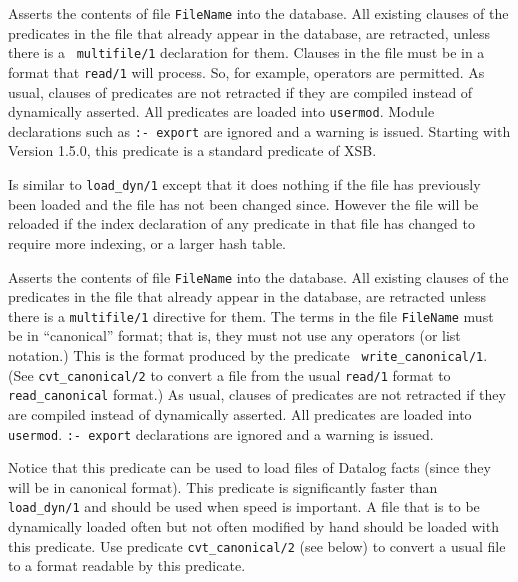 \begin{description}
\label{load_dyn/1}
    Asserts the contents of file {\tt FileName} into the database.
    All existing clauses of the predicates in the file that already
    appear in the database, are retracted, unless there is a {\tt
    multifile/1} declaration for them.  Clauses in the file must be
    in a format that {\tt read/1} will process.  So, for example,
    operators are permitted.  As usual, clauses of predicates are not
    retracted if they are compiled instead of dynamically asserted.
    All predicates are loaded into {\tt usermod}.  Module declarations
    such as {\tt :- export} are ignored and a warning is issued.
    Starting with Version 1.5.0, this predicate is a standard predicate
    of XSB.

    Is similar to {\tt load\_dyn/1} except that it does nothing if the
    file has previously been loaded and the file has not been changed
    since.  However the file will be reloaded if the index declaration of
    any predicate in that file has changed to require more indexing, or a
    larger hash table.

    Asserts the contents of file {\tt FileName} into the database.
    All existing clauses of the predicates in the file that already appear
    in the database, are retracted unless there is a {\tt multifile/1}
    directive for them.  The terms in the file {\tt FileName} must be in
    ``canonical'' format; that is, they must not use any operators (or
    list notation.) This is the format produced by the predicate {\tt
    write\_canonical/1}. (See {\tt cvt\_canonical/2} to convert a file from
    the usual {\tt read/1} format to {\tt read\_canonical} format.)  As
    usual, clauses of predicates are not retracted if they are compiled
    instead of dynamically asserted. All predicates are loaded into {\tt
    usermod}.  {\tt :- export} declarations are ignored and a warning is
    issued.

    Notice that this predicate can be used to load files of Datalog facts
    (since they will be in canonical format).  This predicate is
    significantly faster than {\tt load\_dyn/1} and should be used when
    speed is important.  A file that is to be dynamically loaded often but
    not often modified by hand should be loaded with this predicate.  Use
    predicate {\tt cvt\_canonical/2} (see below) to convert a usual file
    to a format readable by this predicate.


\end{description}
